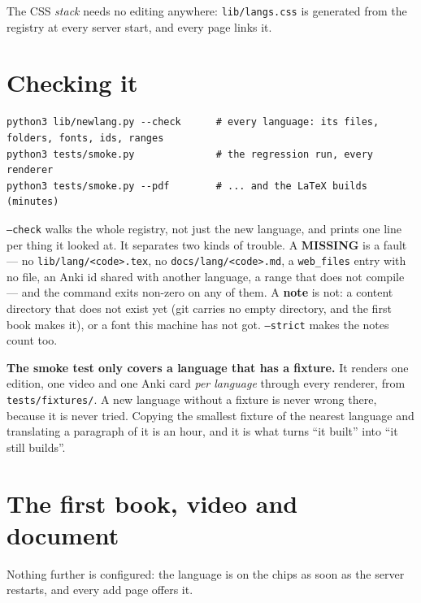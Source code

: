\documentclass[11pt,oneside]{report}
\newcommand{\file}[1]{\texttt{#1}}
\begin{document}
\noindent The CSS \emph{stack} needs no editing anywhere: \file{lib/langs.css}
is generated from the registry at every server start, and every page links it.

\section{Checking it}

\begin{lstlisting}
python3 lib/newlang.py --check      # every language: its files, folders, fonts, ids, ranges
python3 tests/smoke.py              # the regression run, every renderer
python3 tests/smoke.py --pdf        # ... and the LaTeX builds (minutes)
\end{lstlisting}

\file{--check} walks the whole registry, not just the new language, and prints
one line per thing it looked at. It separates two kinds of trouble. A
\textbf{MISSING} is a fault --- no \file{lib/lang/<code>.tex}, no
\file{docs/lang/<code>.md}, a \texttt{web\_files} entry with no file, an Anki
id shared with another language, a range that does not compile --- and the
command exits non-zero on any of them. A \textbf{note} is not: a content
directory that does not exist yet (git carries no empty directory, and the
first book makes it), or a font this machine has not got. \texttt{--strict}
makes the notes count too.

\begin{goodbox}
\textbf{The smoke test only covers a language that has a fixture.} It renders
one edition, one video and one Anki card \emph{per language} through every
renderer, from \file{tests/fixtures/}. A new language without a fixture is
never wrong there, because it is never tried. Copying the smallest fixture of
the nearest language and translating a paragraph of it is an hour, and it is
what turns ``it built'' into ``it still builds''.
\end{goodbox}

\section{The first book, video and document}

Nothing further is configured: the language is on the chips as soon as the
server restarts, and every add page offers it.
\end{document}
